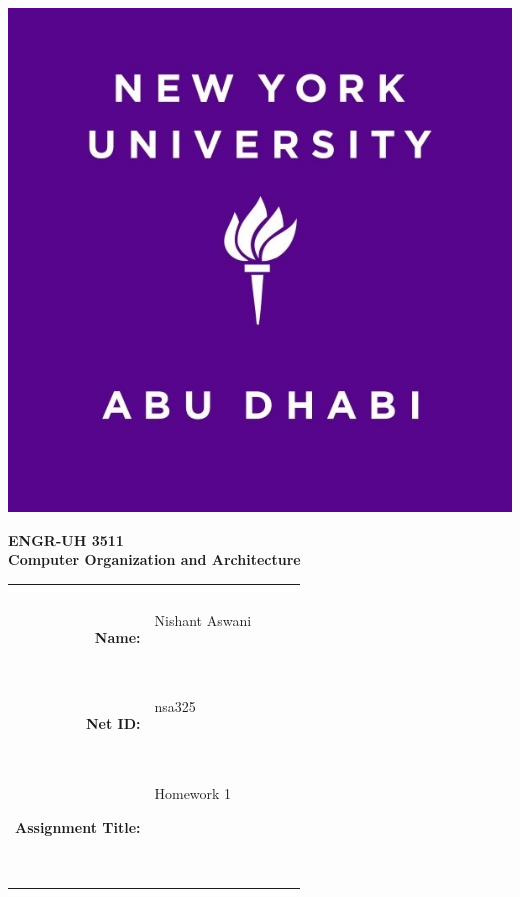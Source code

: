 \documentclass{article}
\begin{document}
\pagestyle{fancy}
\fancyhf{}
\renewcommand{\headrulewidth}{0pt}

\begin{center}
  \includegraphics[scale=0.15]{NYUAD-alt-logo.jpg}
\end{center}

{\vspace{1.5em}}

\begin{center}
    \Huge{\textbf{ENGR-UH 3511}}\\
    {\vspace{0.5em}}
    \Huge{\textbf{Computer Organization and Architecture}}
\end{center}

{\vspace{10em}}

\begin{center}
  \begin{tabular}{|rp{5.0cm}lll|}
    \hline
    &  &  &  & \\
    &  &  &  & \\
    \Large{\textbf{Name:}} & \Large{Nishant Aswani}
    
    \  &  &  & \\
    \Large{\textbf{Net ID:}} & \Large{nsa325}
    
    \  &  &  & \\
    \Large{\textbf{Assignment Title:}} & \Large{Homework 1}
    
    \
    
    \  &  &  & \\
    \hline
  \end{tabular}
\end{center}

\

{\newpage}
\end{document}
